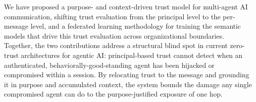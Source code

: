 \documentclass[sigconf,nonacm]{acmart}
\begin{document}

We have proposed a purpose- and context-driven trust model for multi-agent AI communication, shifting trust evaluation from the principal level to the per-message level, and a federated learning methodology for training the semantic models that drive this trust evaluation across organizational boundaries. Together, the two contributions address a structural blind spot in current zero-trust architectures for agentic AI: principal-based trust cannot detect when an authenticated, behaviorally-good-standing agent has been hijacked or compromised within a session. By relocating trust to the message and grounding it in purpose and accumulated context, the system bounds the damage any single compromised agent can do to the purpose-justified exposure of one hop.




\end{document}
